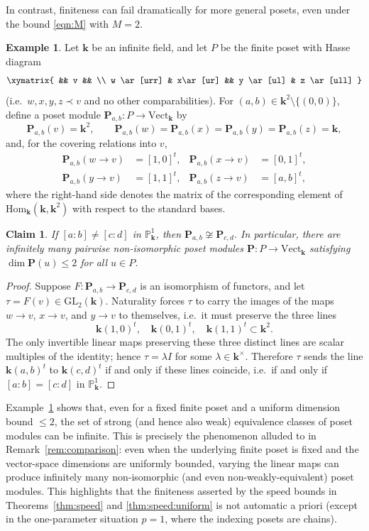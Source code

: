 \documentclass{amsart}[10pts]
\newtheorem{claim}{Claim}[section]
\theoremstyle{definition}
\newtheorem{example}{Example}[section]
\theoremstyle{remark}
\theoremstyle{observation}
\numberwithin{equation}{section}
\newcommand {\kk}         {\mathbf{k}}
\newcommand {\PP}     {\mathbb{P}} %
\newcommand{\Hom}{\mathrm{Hom}}
\newcommand{\Vect}{\mathrm{Vect}}
\begin{document}
In contrast, finiteness can fail dramatically for more general posets, even under the bound \eqref{eqn:M} with $M=2$.

\begin{example}
\label{eg:infinite}
Let $\kk$ be an infinite field, and let $P$ be the finite poset with Hasse diagram
\[
\xymatrix{
&& v && \\
w \ar[urr] & x\ar[ur] && y \ar[ul] & z \ar[ull]
}
\]
(i.e.\ $w,x,y,z\prec v$ and no other comparabilities). For $(a,b)\in \kk^2\setminus\{(0,0)\}$, define a poset module
$\mathbf P_{a,b}:P\to \Vect_{\kk}$ by
\[
\mathbf P_{a,b}(v)=\kk^2,
\qquad
\mathbf P_{a,b}(w)=\mathbf P_{a,b}(x)=\mathbf P_{a,b}(y)=\mathbf P_{a,b}(z)=\kk,
\]
and, for the covering relations into $v$,
\begin{align*}
\mathbf P_{a,b}(w\to v)&=[1,0]^t, &
\mathbf P_{a,b}(x\to v)&=[0,1]^t,\\
\mathbf P_{a,b}(y\to v)&=[1,1]^t, &
\mathbf P_{a,b}(z\to v)&=[a,b]^t,
\end{align*}
where the right-hand side denotes the matrix of the corresponding element of $\Hom_{\kk}(\kk,\kk^2)$ with respect to the standard bases.

\begin{claim}
If $[a:b]\neq [c:d]$ in $\PP^1_{\kk}$, then $\mathbf P_{a,b}\not\cong \mathbf P_{c,d}$. In particular, there are infinitely many pairwise non-isomorphic poset modules $\mathbf P:P\to \Vect_{\kk}$ satisfying $\dim \mathbf P(u)\le 2$ for all $u\in P$.
\end{claim}

\begin{proof}
Suppose $F:\mathbf P_{a,b}\to \mathbf P_{c,d}$ is an isomorphism of functors, and let $\tau=F(v)\in \mathrm{GL}_2(\kk)$.
Naturality forces $\tau$ to carry the images of the maps $w\to v$, $x\to v$, and $y\to v$ to themselves, i.e.\ it must preserve the three lines
\[
\kk(1,0)^t,\quad \kk(0,1)^t,\quad \kk(1,1)^t \subset \kk^2.
\]
The only invertible linear maps preserving these three distinct lines are scalar multiples of the identity; hence $\tau=\lambda I$ for some $\lambda\in \kk^\times$.
Therefore $\tau$ sends the line $\kk(a,b)^t$ to $\kk(c,d)^t$ if and only if these lines coincide, i.e.\ if and only if $[a:b]=[c:d]$ in $\PP^1_{\kk}$.
\end{proof}
\end{example}

Example~\ref{eg:infinite} shows that, even for a fixed finite poset and a uniform dimension bound $\le 2$, the set of strong (and hence also weak) equivalence classes of poset modules can be infinite.
This is precisely the phenomenon alluded to in Remark~\ref{rem:comparison}: even when the underlying finite poset is fixed and the vector-space dimensions are uniformly bounded, varying the linear maps can produce infinitely many non-isomorphic (and even non-weakly-equivalent) poset modules.
This highlights that the finiteness asserted by the speed bounds in Theorems~\ref{thm:speed} and \ref{thm:speed:uniform} is not automatic a priori (except in the one-parameter situation $p=1$, where the indexing posets are chains).
\end{document}
